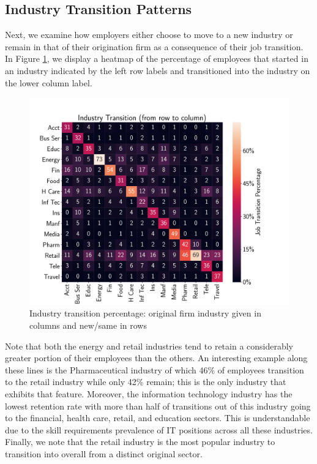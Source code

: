 \documentclass[10pt]{article}
\begin{document}
\subsection{Industry Transition Patterns}

Next, we examine how employers either choose to move to a new industry or remain
in that of their origination firm as a consequence of their job transition.  
In Figure \ref{fig:transmat}, we display a heatmap of the percentage of 
employees that started in an industry indicated by the left row labels and 
transitioned into the industry on the lower column label. 
%
\begin{figure}[thb]
    \centering
	\includegraphics[width=1.0\linewidth]{transmat.pdf}
	\caption{Industry transition percentage: original firm 
   industry given in columns and new/same in rows}
	\label{fig:transmat}
\end{figure}
%
Note that both the energy and retail industries tend to retain a considerably 
greater portion of their employees than the others.  An interesting example 
along these lines is the Pharmaceutical industry of which 46\% of employees 
transition to the retail industry while only 42\% remain; this is the only industry 
that exhibits that feature.  Moreover, the information technology industry has 
the lowest retention rate with more than half of transitions out of this industry 
going to the financial, health care, retail, and education sectors.  This is understandable 
due to the skill requirements prevalence of IT positions across all these industries.  
Finally, we note that the retail industry is the most popular industry to transition 
into overall from a distinct original sector.
\end{document}
